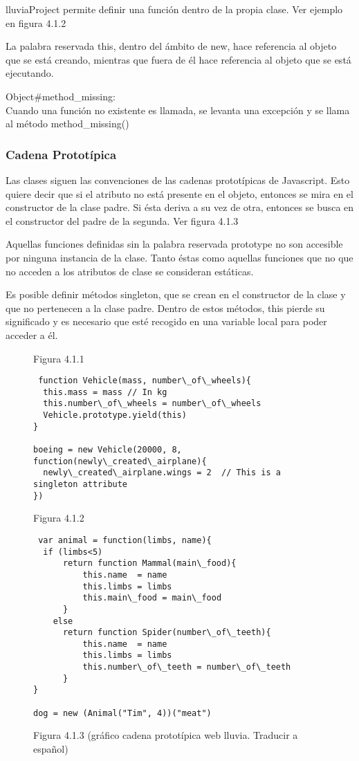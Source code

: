 lluviaProject permite definir una función dentro de la propia clase. Ver ejemplo en figura 4.1.2

La palabra reservada this, dentro del ámbito de new, hace referencia al objeto que se está creando, mientras que fuera de él hace 
referencia al objeto que se está ejecutando. 

Object\#method\_missing:\\

Cuando una función no existente es llamada, se levanta una excepción y se llama al método method\_missing()


\subsubsection{Cadena Prototípica}
\label{subsubsection:prototipos}

Las clases siguen las convenciones de las cadenas prototípicas de Javascript. Esto quiere decir que si el atributo no está presente en el 
objeto, entonces se mira en el constructor de la clase padre. Si ésta deriva a su vez de otra, entonces se busca en el constructor del 
padre de la segunda. Ver figura 4.1.3

Aquellas funciones definidas sin la palabra reservada prototype no son accesible por ninguna instancia de la clase. Tanto éstas como aquellas 
funciones que no que no acceden a los atributos de clase se consideran estáticas.

Es posible definir métodos singleton, que se crean en el constructor de la clase y que no pertenecen a la clase padre. Dentro de estos 
métodos, this pierde su significado y es necesario que esté recogido en una variable local para poder acceder a él.\\


\begin{figure}
Figura 4.1.1
\begin{verbatim}
 function Vehicle(mass, number\_of\_wheels){
  this.mass = mass // In kg 
  this.number\_of\_wheels = number\_of\_wheels
  Vehicle.prototype.yield(this)
}

boeing = new Vehicle(20000, 8, function(newly\_created\_airplane){
  newly\_created\_airplane.wings = 2  // This is a singleton attribute
})
\end{verbatim}

Figura 4.1.2
\begin{verbatim}
 var animal = function(limbs, name){
  if (limbs<5)
      return function Mammal(main\_food){
          this.name  = name
          this.limbs = limbs
          this.main\_food = main\_food
      }
    else
      return function Spider(number\_of\_teeth){
          this.name  = name
          this.limbs = limbs
          this.number\_of\_teeth = number\_of\_teeth
      }
}

dog = new (Animal("Tim", 4))("meat")
\end{verbatim}

Figura 4.1.3
(gráfico cadena prototípica web lluvia. Traducir a español)
\end{figure}


